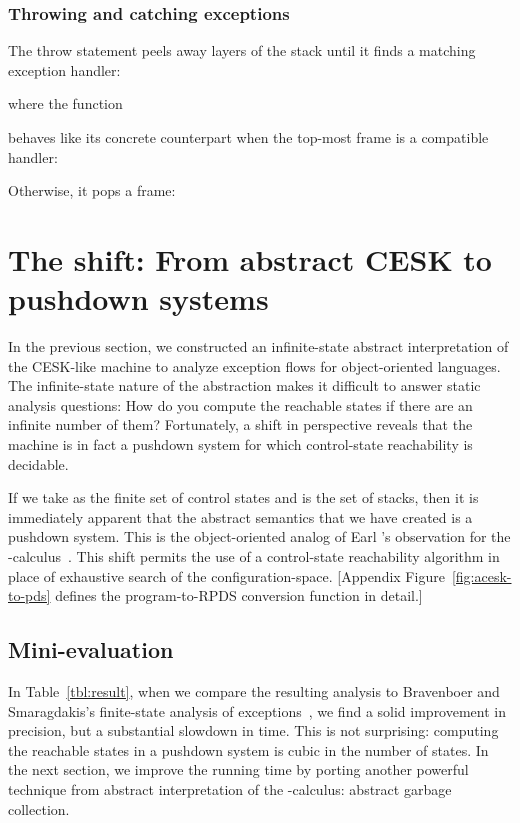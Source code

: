    
\subsubsection{\textbf{Throwing and catching exceptions}}
  The throw statement peels away layers of the stack until it finds a matching exception handler:

  where the function 
  
  
  behaves like its concrete counterpart when the top-most frame is a
  compatible handler:

Otherwise, it pops a frame:

  
          
\section{The shift: From abstract CESK to pushdown systems} 

  In the previous section, we constructed an infinite-state abstract
    interpretation of the CESK-like machine to analyze exception flows 
    for object-oriented languages.
The infinite-state nature of the abstraction makes it difficult 
    to answer static analysis questions:
How do you compute the reachable states if there are an infinite number of them?
Fortunately,   a shift in perspective reveals that the machine 
is in fact a pushdown system for which control-state reachability is decidable.


     If we take 
     as the finite set of control states and
      is the set of stacks,
     then it is immediately apparent that 
     the abstract semantics that we have created is a pushdown
     system.
This is the object-oriented analog of Earl \etal's observation
     for the -calculus~\cite{Earl:2012:IPDCFA}.
This shift permits the use of a control-state reachability
       algorithm in place of exhaustive search of the
       configuration-space.
[Appendix Figure~\ref{fig:acesk-to-pds} defines the program-to-RPDS conversion function
                  in detail.]

\subsection{Mini-evaluation}

In Table~\ref{tbl:result}, when we compare the resulting analysis to 
Bravenboer and Smaragdakis's 
finite-state analysis of exceptions~\cite{mattmight:Bravenboer:2009:Exceptions},
we find a solid improvement in precision, but a substantial slowdown in time.
This is not surprising: 
computing the reachable states in a pushdown system 
is cubic in the number of states.
In the next section, we improve the running time
by porting another powerful technique from abstract interpretation of the -calculus:
abstract garbage collection.


